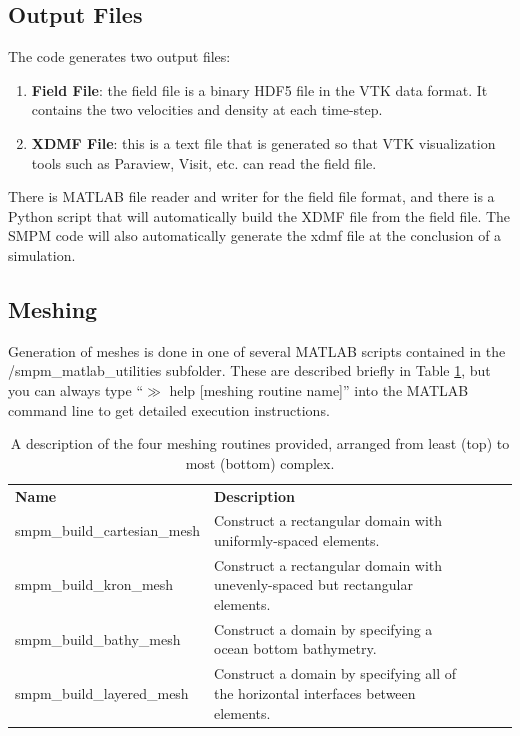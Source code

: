 \documentclass[onside]{article}
\begin{document}
\subsection{Output Files}

The code generates two output files:
\begin{enumerate}
	\item \textbf{Field File}: the field file is a binary HDF5 file in the VTK data format.  It contains the two velocities and density at each time-step.
	\item \textbf{XDMF File}: this is a text file that is generated so that VTK visualization tools such as Paraview, Visit, etc. can read the field file.
\end{enumerate}

There is MATLAB file reader and writer for the field file format, and there is a Python script that will automatically build the XDMF file from the field file.  The SMPM code will also automatically generate the xdmf file at the conclusion of a simulation. 

	\subsection{Meshing}
	
	Generation of meshes is done in one of several MATLAB scripts contained in the /smpm\_matlab\_utilities subfolder.  These are described briefly in Table \ref{meshing}, but you can always type ``$\gg$ help [meshing routine name]'' into the MATLAB command line to get detailed execution instructions.
	
\begin{table}[h]
\centering
\caption{A description of the four meshing routines provided, arranged from least (top) to most (bottom) complex.}
\label{meshing}
\begin{tabular}{lllll}
{\bf Name}                   & {\bf Description}                                                             &  &  &  \\
smpm\_build\_cartesian\_mesh & Construct a rectangular domain with uniformly-spaced elements.                      &  &  &  \\
smpm\_build\_kron\_mesh      & Construct a rectangular domain with unevenly-spaced but rectangular elements.       &  &  &  \\
smpm\_build\_bathy\_mesh     & Construct a domain by specifying a ocean bottom bathymetry.                         &  &  &  \\
smpm\_build\_layered\_mesh   & Construct a domain by specifying all of the horizontal interfaces between elements. &  &  & \end{tabular}
\end{table}
	
\end{document}
